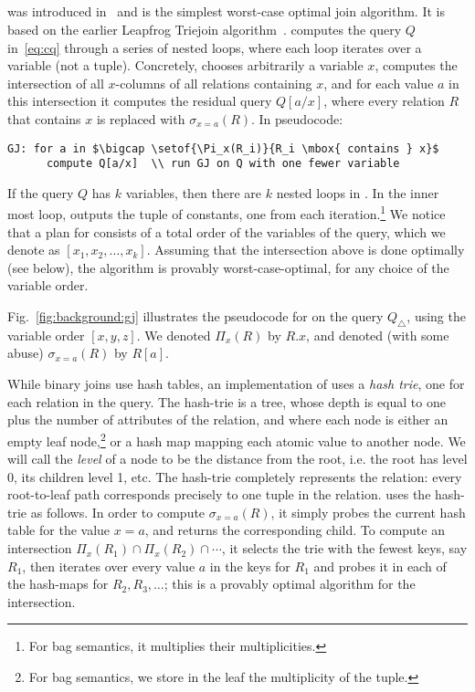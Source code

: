 \subsection{\GJ}\label{sec:background:gj}

\GJ was introduced in~\cite{DBLP:journals/sigmod/NgoRR13} and is the
simplest worst-case optimal join algorithm.  It is based on the
earlier Leapfrog Triejoin algorithm~\cite{DBLP:conf/icdt/Veldhuizen14}.
%
\GJ computes the query $Q$ in~\eqref{eq:cq} through a series of nested
loops, where each loop iterates over a variable (not a tuple).
Concretely, \GJ chooses arbitrarily a variable $x$, computes the
intersection of all $x$-columns of all relations containing $x$, and
for each value $a$ in this intersection it computes the residual query
$Q[a/x]$, where every relation $R$ that contains $x$ is replaced with
$\sigma_{x=a}(R)$.  In pseudocode:
%
\begin{lstlisting}
GJ: for a in $\bigcap \setof{\Pi_x(R_i)}{R_i \mbox{ contains } x}$
      compute Q[a/x]  \\ run GJ on Q with one fewer variable
\end{lstlisting}
%
If the query $Q$ has $k$ variables, then there are $k$ nested loops in
\GJ.  In the inner most loop, \GJ outputs the tuple of constants, one
from each iteration.\footnote{For bag semantics, it multiplies their
  multiplicities.}  We notice that a plan for \GJ consists of a total
order of the variables of the query, which we denote as
$[x_1, x_2, \ldots, x_k]$.  Assuming that the intersection above is
done optimally (see below), the algorithm is provably
worst-case-optimal, for any choice of the variable order.

\begin{example}
  Fig.~\ref{fig:background:gj} illustrates the pseudocode for \GJ on the
  query $Q_\triangle$, using the variable order $[x,y,z]$.  We denoted
  $\Pi_x(R)$ by $R.x$, and denoted (with some abuse) $\sigma_{x=a}(R)$
  by $R[a]$.
\end{example}


While binary joins use hash tables, an implementation of \GJ uses a
\emph{hash trie}, one for each relation in the query.  The hash-trie
is a tree, whose depth is equal to one plus the number of attributes
of the relation, and where each node is either an empty leaf
node,\footnote{For bag semantics, we store in the leaf the
  multiplicity of the tuple.} or a hash map mapping each atomic value
to another node.  We will call the \emph{level} of a node to be the
distance from the root, i.e. the root has level 0, its children level
1, etc.  The hash-trie completely represents the relation: every
root-to-leaf path corresponds precisely to one tuple in the relation.
\GJ uses the hash-trie as follows.  In order to compute
$\sigma_{x=a}(R)$, it simply probes the current hash table for the
value $x=a$, and returns the corresponding child.  To compute an
intersection $\Pi_x(R_1) \cap \Pi_x(R_2) \cap \cdots$, it selects the
trie with the fewest keys, say $R_1$, then iterates over every value
$a$ in the keys for $R_1$ and probes it in each of the hash-maps for
$R_2, R_3, \ldots$; this is a provably optimal algorithm for the
intersection.


